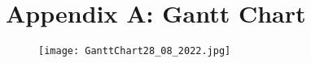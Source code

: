 \documentclass[a4paper,11pt]{article}
\begin{document}





\newpage
\appendix
\appendixpage
\section{Appendix A: Gantt Chart}\label{section:gantt}

\begin{figure}[h]\label{fig:ganttChart} 
    \texttt{[image: GanttChart28\_08\_2022.jpg]}
    \centering
\end{figure}
\end{document}
